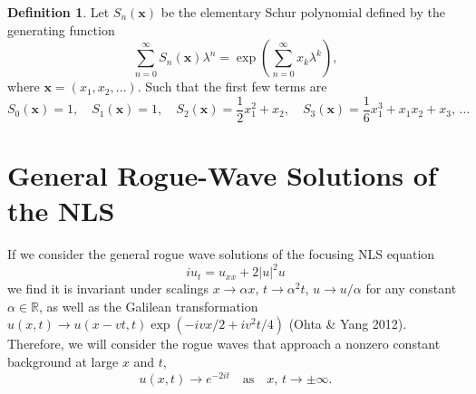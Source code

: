 \documentclass{beamer}
\def\e{\end}
\theoremstyle{plain}
\theoremstyle{definition}
\newtheorem{dfn}{Definition}[section]
\begin{document}
%

\frame
{
\begin{dfn} Let $S_n(\boldsymbol x)$ be the elementary Schur polynomial defined by the generating function
\begin{equation*}\tag{1.3}
\sum_{n=0}^{\infty}S_n(\boldsymbol x)\lambda^n=\exp\left(\sum_{n=0}^{\infty}x_k\lambda^k\right),
\e{equation*}
where $\boldsymbol x=(x_1,x_2,\ldots)$. Such that the first few terms are
\begin{equation*}
S_0(\boldsymbol x)=1,\quad S_1(\boldsymbol x)=1,\quad S_2(\boldsymbol x)=\frac{1}{2}x_{1}^2+x_2,\quad S_3(\boldsymbol x)=\frac{1}{6}x_{1}^3+x_1x_2+x_3,\, \ldots
\e{equation*}
\e{dfn}
}


\section{General Rogue-Wave Solutions of the NLS}
\frame
{
If we consider the general rogue wave solutions of the focusing NLS equation
\begin{equation*}\tag{2.1}
iu_t=u_{xx}+2|u|^2u
\e{equation*}
we find it is invariant under scalings $x\rightarrow\alpha x$, $t\rightarrow\alpha^2t$, $u\rightarrow u/\alpha$ for any constant $\alpha\in\mathbb{R}$, as well as the Galilean transformation $u(x,t)\rightarrow u(x-vt,t)\exp(-ivx/2+iv^2t/4)$ (Ohta \& Yang 2012).
Therefore, we will consider the rogue waves that approach a nonzero constant background at large $x$ and $t$,
\begin{equation*}
u(x,t)\rightarrow e^{-2it}\quad\text{as}\quad x,\,t\rightarrow\pm\infty.
\e{equation*}
}
\end{document}
